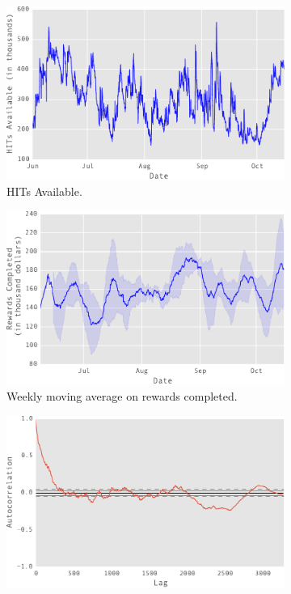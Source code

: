 \begin{figure}[t!]
    \centering
    \begin{subfigure}[b]{0.48\textwidth}
        \centering
        \includegraphics[width=\textwidth]{figures/out}
        \caption{HITs Available.}
        \label{fig:hitav}
    \end{subfigure}
    \hfill
    \begin{subfigure}[b]{0.48\textwidth}
        \centering
        \includegraphics[width=\textwidth]{figures/mac}
        \caption{Weekly moving average on rewards completed.}
        \label{fig:mac}
    \end{subfigure}
    \hfill
    \begin{subfigure}[b]{0.48\textwidth}
        \centering
        \includegraphics[width=\textwidth]{figures/out1}

\end{subfigure}
\end{figure}
